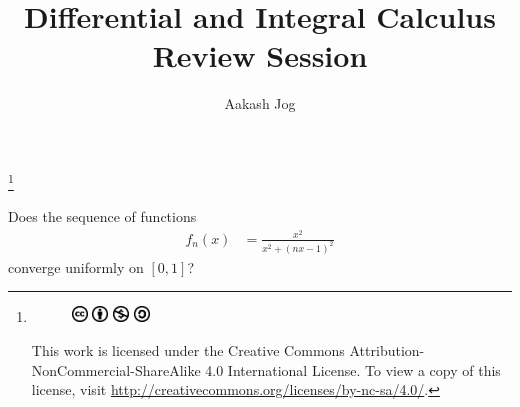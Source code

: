 \documentclass[fleqn, a4paper, 12pt, twoside]{article}
\title{Differential and Integral Calculus\\Review Session}
\author{Aakash Jog}
\date{\formatdate{17}{6}{2015}}
\theoremstyle{definition}
\theoremstyle{theorem}
\newcommand\blfootnote[1]{%
	\begingroup
	\renewcommand\thefootnote{}\footnote{#1}%
	\addtocounter{footnote}{-1}%
	\endgroup
}
\begin{document}
\maketitle

\blfootnote
{	
	\begin{figure}[H]
		\includegraphics[height = 12pt]{cc.eps}
		\includegraphics[height = 12pt]{by.eps}
		\includegraphics[height = 12pt]{nc.eps}
		\includegraphics[height = 12pt]{sa.eps}
	\end{figure}
	This work is licensed under the Creative Commons Attribution-NonCommercial-ShareAlike 4.0 International License. To view a copy of this license, visit \url{http://creativecommons.org/licenses/by-nc-sa/4.0/}.
} %

\newpage
\begin{question}
	Does the sequence of functions
	\begin{align*}
		f_n(x) & = \frac{x^2}{x^2 + (n x - 1)^2}
	\end{align*}
	converge uniformly on $[0,1]$?
\end{question}
\end{document}
